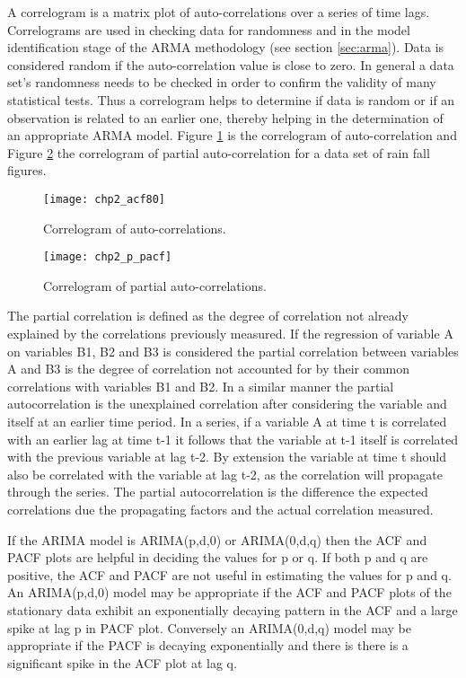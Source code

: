 A correlogram is a matrix plot of auto-correlations over a series of time lags.  Correlograms are used in checking data for randomness and in the model identification stage of the ARMA methodology (see section \ref{sec:arma}). Data is considered random if the auto-correlation value is close to zero.  In general a data set's randomness needs to be checked in order to confirm the validity of many statistical tests. Thus a correlogram helps to determine if data is random or if an observation is related to an earlier one, thereby helping in the determination of an appropriate ARMA model. Figure \ref{fig:acf80} is the correlogram of auto-correlation and Figure \ref{fig:pacf} the correlogram of partial auto-correlation for a data set of rain fall figures.


\begin{figure}[tbph!]
\centering
\texttt{[image: chp2\_acf80]}
\caption[Correlogram of auto-correlations]{Correlogram of auto-correlations.}
\label{fig:acf80}
\end{figure}

\begin{figure}[tbph!]
\centering
\texttt{[image: chp2\_p\_pacf]}
\caption[Correlogram of partial auto-correlations]{Correlogram of partial auto-correlations.}
\label{fig:pacf}
\end{figure}

The partial correlation is defined as the degree of correlation not already explained by the correlations previously measured. If the regression of variable A on variables B1, B2 and B3 is considered the partial correlation between variables A and B3 is the degree of correlation not accounted for by their common correlations with variables B1 and B2. In a similar manner the partial autocorrelation is the unexplained correlation after considering the variable and itself at an earlier time period. In a series, if a variable A at time t is correlated with an earlier lag at time t-1 it follows that the variable at t-1 itself is correlated with the previous variable at lag t-2. By extension the variable at time t should also be correlated with the variable at lag t-2, as the correlation will propagate through the series. The partial autocorrelation is the difference the expected correlations due the propagating factors and the actual correlation measured.

If the ARIMA model is ARIMA(p,d,0) or ARIMA(0,d,q) then the ACF and PACF plots are helpful in deciding the values for p or q. If both p and q are positive, the ACF and PACF are not useful in estimating the values for p and q. An ARIMA(p,d,0) model may be appropriate if the ACF and PACF plots of the stationary data exhibit an exponentially decaying pattern in the ACF and a large spike at lag p in PACF plot. Conversely an ARIMA(0,d,q) model may be appropriate if the PACF is decaying exponentially and there is there is a significant spike in the ACF plot at lag q.

